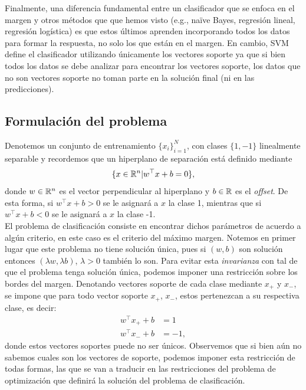 Finalmente, una diferencia fundamental entre un clasificador que se enfoca en el margen y otros métodos que que hemos visto (e.g., na\"ive Bayes, regresión lineal, regresión logística) es que estos últimos aprenden incorporando todos los datos para formar la respuesta, no solo los que están en el margen. En cambio, SVM define el clasificador utilizando únicamente los vectores soporte ya que si bien todos los datos se debe analizar para encontrar los vectores soporte, los datos que no son vectores soporte no toman parte en la solución final (ni en las predicciones).

\subsection{Formulación del problema}

Denotemos un conjunto de entrenamiento $\{x_i\}_{i=1}^N$, con clases $\{1,-1\}$ linealmente separable y recordemos que un hiperplano de separación está definido mediante
\begin{equation}
    \{x\in \mathbb{R}^n | w^\top x + b = 0 \},\label{ec:hiperplano_svm}
\end{equation}
donde $w\in \mathbb{R}^n$ es el vector perpendicular al hiperplano y $b\in \mathbb{R}$ es el \emph{offset}. De esta forma, si $w^\top x + b >0$ se le asignará a $x$ la clase 1, mientras que si $w^\top x + b <0$ se le asignará a $x$ la clase -1.\\

El problema de clasificación consiste en encontrar dichos parámetros de acuerdo a algún criterio, en este caso es el criterio del máximo margen. Notemos en primer lugar que este problema no tiene solución única, pues si $(w,b)$ son solución entonces $(\lambda w, \lambda b)$, $\lambda>0$ también lo son. Para evitar esta \emph{invarianza} con tal de que el problema tenga solución única, podemos imponer una restricción sobre los bordes del margen. Denotando vectores soporte de cada clase mediante $x_{+}$ y $x_{-}$, se impone que para todo vector soporte $x_+$, $x_-$, estos pertenezcan a su respectiva clase, es decir:
\begin{align}
 	w^\top x_{+} + b &= 1 \label{ec:borde_svm1}\\
 	w^\top x_{-} + b &=  -1,\label{ec:borde_svm2}
 \end{align}
 donde estos vectores soportes puede no ser únicos. Observemos que si bien aún no sabemos cuales son los vectores de soporte, podemos imponer esta restricción de todas formas, las que se van a traducir en las restricciones del problema de optimización que definirá la solución del problema de clasificación.\\
 
